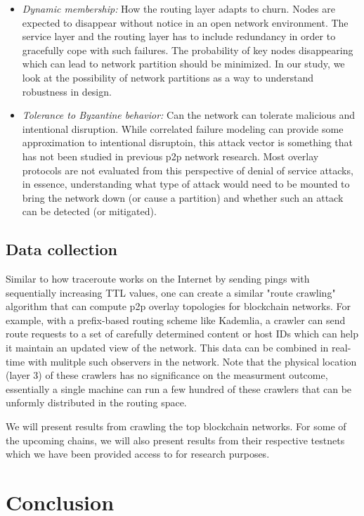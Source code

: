 \documentclass[journal]{IEEEtran}
\begin{document}
\begin{itemize}
    \item {\em Dynamic membership:} How the routing layer adapts to churn. Nodes are expected to disappear without
        notice in an open network environment. The service layer and the routing layer has to include redundancy in
        order to gracefully cope with such failures. The probability of key nodes disappearing which can lead to network
        partition should be minimized. In our study, we look at the possibility of network partitions as a way to
        understand robustness in design.
    \item {\em Tolerance to Byzantine behavior:} Can the network can tolerate malicious and intentional disruption.
        While correlated failure modeling can provide some approximation to intentional disruptoin, this attack vector
        is something that has not been studied in previous p2p network research. Most overlay protocols are not
        evaluated from this perspective of denial of service attacks, in essence, understanding what type of attack
        would need to be mounted to bring the network down (or cause a partition) and whether such an attack can be
        detected (or mitigated).
\end{itemize}

\subsection{Data collection}

Similar to how traceroute works on the Internet by sending pings with sequentially increasing TTL values, one can create
a similar "route crawling" algorithm that can compute p2p overlay topologies for blockchain networks. For example, with
a prefix-based routing scheme like Kademlia, a crawler can send route requests to a set of carefully determined content
or host IDs which can help it maintain an updated view of the network. This data can be combined in real-time with
mulitple such observers in the network. Note that the physical location (layer 3) of these crawlers has no significance
on the measurment outcome, essentially a single machine can run a few hundred of these crawlers that can be unformly
distributed in the routing space.

We will present results from crawling the top blockchain networks. For some of the upcoming chains, we will also
present results from their respective testnets which we have been provided access to for research purposes. 

\section{Conclusion}
\label{sec:conc}
\end{document}
